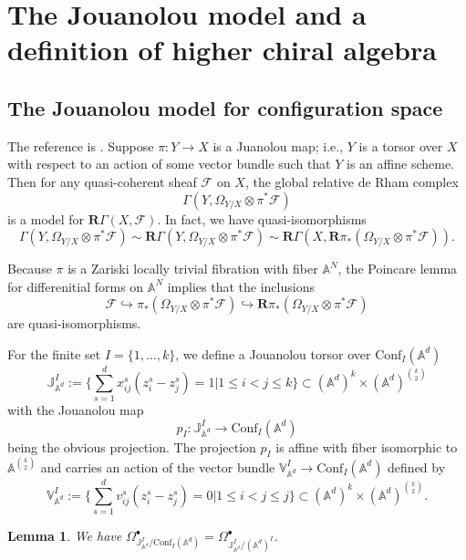 \documentclass[11pt]{amsart}
\newtheorem{lem}[thm]{Lemma}
\theoremstyle{definition}
\theoremstyle{remark}
\numberwithin{equation}{section}
\newcommand{\R}{\mathbf{R}}
\begin{document}
\section{The Jouanolou model and a definition of higher chiral algebra}\label{s:Jouanolou}

\subsection{The Jouanolou model for configuration space}
The reference is \cite[Section 4.1.3, pp279]{BD}. Suppose $\pi:Y\rightarrow X$ is a Juanolou map; i.e., $Y$ is a torsor over $X$ with respect to an action of some vector bundle such that $Y$ is an affine scheme. Then for any quasi-coherent sheaf $\mathcal{F}$ on $X$, the global relative de Rham complex
$$
\Gamma(Y,\Omega_{Y/X}\otimes\pi^*\mathcal{F})
$$
is a model for $\R\Gamma(X,\mathcal{F})$. In fact, we have quasi-isomorphisms
$$
\Gamma(Y,\Omega_{Y/X}\otimes\pi^*\mathcal{F})\sim \R\Gamma(Y,\Omega_{Y/X}\otimes\pi^*\mathcal{F})\sim \R\Gamma(X,\R\pi_*(\Omega_{Y/X}\otimes\pi^*\mathcal{F})).
$$




Because $\pi$ is a Zariski locally trivial fibration with fiber $\mathbb{A}^N$, the Poincare lemma for differenitial
forms on $\mathbb{A}^N$ implies that the inclusions
$$
\mathcal{F}\hookrightarrow \pi_*(\Omega_{Y/X}\otimes\pi^*\mathcal{F})\hookrightarrow \R\pi_*(\Omega_{Y/X}\otimes\pi^*\mathcal{F})
$$
are quasi-isomorphisms.

For the finite set $I = \{1,\ldots,k\}$, we define a Jouanolou torsor over $\mathrm{Conf}_{{I}}(\mathbb{A}^d)$
$$
\mathbb{J}_{\mathbb{A}^d}^{{I}}:=\{\sum_{s=1}^d x_{ij}^s(z^s_i-z^s_j)=1|1\leq i<j\leq k \}\subset (\mathbb{A}^d)^{k}\times (\mathbb{A}^d)^{\binom{k}{2}}
$$
with the Jouanolou map
\[
p_{{I}}\colon\mathbb{J}_{\mathbb{A}^d}^{{I}}\rightarrow \mathrm{Conf}_{{I}}(\mathbb{A}^d)
\]
being the obvious projection.
The projection $p_{{I}}$ is affine with fiber isomorphic to $\mathbb{A}^{\binom{k}{2}}$ and carries an action of the vector bundle $\mathbb{V}_{\mathbb{A}^d}^{{I}}\rightarrow \mathrm{Conf}_{{I}}(\mathbb{A}^d)$ defined by
$$
\mathbb{V}_{\mathbb{A}^d}^{{I}}:=\{\sum_{s=1}^d v_{ij}^s(z^s_i-z^s_j)=0|1\leq i<j\leq j\}\subset (\mathbb{A}^d)^{k}\times (\mathbb{A}^d)^{\binom{k}{2}}.
$$
\begin{lem}
    We have $\Omega^{\bullet}_{\mathbb{J}_{\mathbb{A}^d}^{{I}}/\mathrm{Conf}_{{I}}(\mathbb{A}^d)}=\Omega^{\bullet}_{\mathbb{J}_{\mathbb{A}^d}^{{I}}/(\mathbb{A}^d)^{{I}}}$.
\end{lem}
\end{document}
